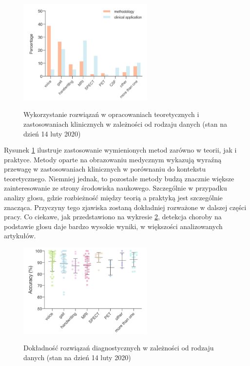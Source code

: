 \begin{figure}[htbp]
	\centering\includegraphics[width=0.6\textwidth]{./img/plot_PD_detection_methods}~\caption{Wykorzystanie rozwiązań w opracowaniach teoretycznych i zastosowaniach klinicznych w zależności od rodzaju danych (stan na dzień 14 luty 2020) \cite{ML_for_PD_review} }
    \label{fig:pd_detection_methods}
\end{figure}


Rysunek \ref{fig:pd_detection_methods} ilustruje zastosowanie wymienionych metod zarówno w teorii, jak i praktyce.
Metody oparte na obrazowaniu medycznym wykazują wyraźną przewagę w zastosowaniach klinicznych w porównaniu do kontekstu teoretycznego.
Niemniej jednak, to pozostałe metody budzą znacznie większe zainteresowanie ze strony środowiska naukowego.
Szczególnie w przypadku analizy głosu, gdzie rozbieżność między teorią a praktyką jest szczególnie znacząca.
Przyczyny tego zjawiska zostaną dokładniej rozważone w dalszej części pracy.
Co ciekawe, jak przedstawiono na wykresie \ref{fig:pd_accuracy_methods}, detekcja choroby na podstawie głosu daje bardzo wysokie wyniki,
w większości analizowanych artykułów.

\begin{figure}[htbp]
	\centering
	\includegraphics[width=0.6\textwidth]{./img/accuracy}~\caption{Dokładność rozwiązań diagnostycznych w zależności od rodzaju danych (stan na dzień 14 luty 2020) \cite{ML_for_PD_review} }
    \label{fig:pd_accuracy_methods}
\end{figure}

